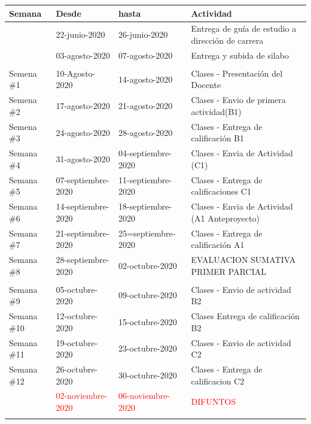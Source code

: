 \documentclass[a4paper,12pt,spanish]{article}
\begin{document}
\begin{center}
\begin{tabular}{|l|l|l|p{10cm}|}
  \hline
  \rowcolor{gray!20}
Semana &  Desde & hasta & Actividad\\
\hline \rowcolor{yellow!20}
       &    22-junio-2020 & 26-junio-2020 & Entrega de guía de estudio a dirección de carrera \\ \hline \rowcolor{yellow!20}
       &    03-agosto-2020 & 07-agosto-2020 & Entrega y subida de silabo \\ \hline \rowcolor{blue!20}
 \multicolumn{4}{|c|}{INICIO PRIMER PARCIAL} \\ \hline \rowcolor{green!20}    
Semena \#1 & 10-Agosto-2020 & 14-agosto-2020 & Clases  - Presentación del Docente\\ \rowcolor{green!20}   
Semena \#2 & 17-agosto-2020 & 21-agosto-2020 & Clases - Envio de primera actividad(B1)\\ \rowcolor{green!20}
Semena \#3 & 24-agosto-2020 & 28-agosto-2020 & Clases - Entrega de calificación B1 \\   \rowcolor{green!20}
Semana \#4 & 31-agosto-2020 & 04-septiembre-2020 & Clases - Envia de Actividad (C1)\\  \rowcolor{green!20}
Semana \#5 & 07-septiembre-2020 & 11-septiembre-2020 & Clases - Entrega de calificaciones  C1\\ \rowcolor{green!20}
Semana \#6 & 14-septiembre-2020 & 18-septiembre-2020 & Clases - Envia de Actividad (A1 Anteproyecto) \\  \rowcolor{green!20}
Semana \#7 & 21-septiembre-2020 & 25=septiembre-2020 & Clases - Entrega de calificación A1  \\ \rowcolor{green!20}
  Semana \#8 & 28-septiembre-2020 & 02-octubre-2020 & EVALUACION SUMATIVA PRIMER PARCIAL\\ \hline \rowcolor{blue!20}
 \multicolumn{4}{|c|}{INICIO SEGUNDO PARCIAL} \\ \hline \rowcolor{green!20}
Semana \#9 & 05-octubre-2020 & 09-octubre-2020 & Clases - Envio de actividad B2\\ \rowcolor{green!20} 
Semana \#10  & 12-octubre-2020 & 15-octubre-2020 & Clases Entrega de calificación B2\\ \rowcolor{green!20}
Semana \#11 &  19-octubre-2020 & 23-octubre-2020 & Clases - Envio de actividad C2 \\ \rowcolor{green!20}
Semana \#12 &  26-octubre-2020 & 30-octubre-2020 & Clases - Entrega de calificacion C2\\ 
 & \textcolor{red}{02-noviembre-2020} & \textcolor{red}{06-noviembre-2020} & \textcolor{red}{DIFUNTOS}\\  \rowcolor{green!20}

\end{tabular}
\end{center}
\end{document}
